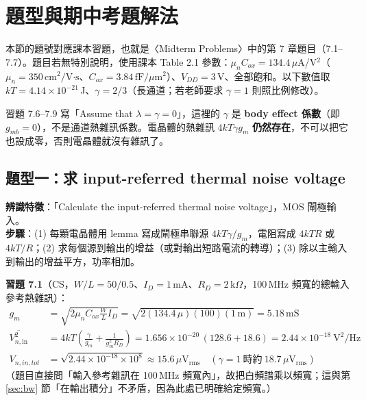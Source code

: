 \documentclass[11pt,a4paper]{article}
\newcommand{\Vsq}[1]{\overline{V^2_{n,\text{#1}}}}
\begin{document}
\section{題型與期中考題解法}\label{sec:problems}

本節的題號對應課本習題，也就是〈Midterm Problems〉中的第 7 章題目（7.1--7.7）。題目若無特別說明，使用課本 Table 2.1 參數：$\mu_nC_{ox}=134.4\,\mu$A/V$^2$（$\mu_n=350\,\text{cm}^2/\text{V·s}$、$C_{ox}=3.84\,\text{fF}/\mu\text{m}^2$）、$V_{DD}=3$\,V、全部飽和。以下數值取 $kT=4.14\times10^{-21}$\,J、$\gamma=2/3$（長通道；若老師要求 $\gamma=1$ 則照比例修改）。

\begin{trapbox}[常見陷阱：習題中「$\lambda=\gamma=0$」的 $\gamma$ 是 body effect]
習題 7.6--7.9 寫「Assume that $\lambda=\gamma=0$」，這裡的 $\gamma$ 是 \textbf{body effect 係數}（即 $g_{mb}=0$），不是通道熱雜訊係數。電晶體的熱雜訊 $4kT\gamma g_m$ \textbf{仍然存在}，不可以把它也設成零，否則電晶體就沒有雜訊了。
\end{trapbox}

\subsection{題型一：求 input-referred thermal noise voltage}
\textbf{辨識特徵}：「Calculate the input-referred thermal noise voltage」，MOS 閘極輸入。\\
\textbf{步驟}：(1) 每顆電晶體用 lemma 寫成閘極串聯源 $4kT\gamma/g_m$，電阻寫成 $4kTR$ 或 $4kT/R$；(2) 求每個源到輸出的增益（或對輸出短路電流的轉導）；(3) 除以主輸入到輸出的增益平方，功率相加。

\textbf{習題 7.1}（CS，$W/L=50/0.5$、$I_D=1$\,mA、$R_D=2$\,k$\Omega$，100\,MHz 頻寬的總輸入參考熱雜訊）：
\begin{align}
g_m&=\sqrt{2\mu_nC_{ox}\tfrac WLI_D}=\sqrt{2(134.4\,\mu)(100)(1\,\text{m})}=5.18\,\text{mS}\\
\Vsq{in}&=4kT\left(\frac{\gamma}{g_m}+\frac{1}{g_m^2R_D}\right)=1.656\times10^{-20}\,(128.6+18.6)=2.44\times10^{-18}\ \text{V}^2/\text{Hz}\\
V_{n,in,tot}&=\sqrt{2.44\times10^{-18}\times10^8}\approx\boxed{15.6\,\mu\text{V}_{\text{rms}}}\quad(\gamma=1\ \text{時約}\ 18.7\,\mu\text{V}_{\text{rms}})
\end{align}
（題目直接問「輸入參考雜訊在 100\,MHz 頻寬內」，故把白頻譜乘以頻寬；這與第 \ref{sec:bw} 節「在輸出積分」不矛盾，因為此處已明確給定頻寬。）
\end{document}

